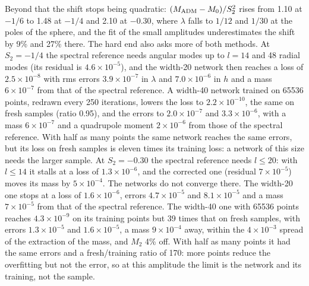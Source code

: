 \documentclass[aps,prd,twocolumn,superscriptaddress, nofootinbib,floatfix]{revtex4-2}
\begin{document}
Beyond that the shift stops being quadratic: $(M_{\rm ADM}-M_0)/S_2^2$ rises from 1.10 at $-1/6$ to 1.48 at $-1/4$ and 2.10 at $-0.30$, where $\lambda$ falls to $1/12$ and $1/30$ at the poles of the sphere, and the fit of the small amplitudes underestimates the shift by 9\% and 27\% there.
The hard end also asks more of both methods.
At $S_2=-1/4$ the spectral reference needs angular modes up to $l=14$ and 48 radial modes (its residual is $4.6\times10^{-5}$), and the width-20 network then reaches a loss of $2.5\times10^{-8}$ with rms errors $3.9\times10^{-7}$ in $\lambda$ and $7.0\times10^{-6}$ in $h$ and a mass $6\times10^{-7}$ from that of the spectral reference.
A width-40 network trained on 65536 points, redrawn every 250 iterations, lowers the loss to $2.2\times10^{-10}$, the same on fresh samples (ratio 0.95), and the errors to $2.0\times10^{-7}$ and $3.3\times10^{-6}$, with a mass $6\times10^{-7}$ and a quadrupole moment $2\times10^{-6}$ from those of the spectral reference.
With half as many points the same network reaches the same errors, but its loss on fresh samples is eleven times its training loss: a network of this size needs the larger sample.
At $S_2=-0.30$ the spectral reference needs $l\leq20$: with $l\leq14$ it stalls at a loss of $1.3\times10^{-6}$, and the corrected one (residual $7\times10^{-5}$) moves its mass by $5\times10^{-4}$.
The networks do not converge there.
The width-20 one stops at a loss of $1.6\times10^{-6}$, errors $4.7\times10^{-5}$ and $8.1\times10^{-5}$ and a mass $7\times10^{-5}$ from that of the spectral reference.
The width-40 one with 65536 points reaches $4.3\times10^{-9}$ on its training points but 39 times that on fresh samples, with errors $1.3\times10^{-5}$ and $1.6\times10^{-5}$, a mass $9\times10^{-4}$ away, within the $4\times10^{-3}$ spread of the extraction of the mass, and $M_2$ 4\% off.
With half as many points it had the same errors and a fresh/training ratio of 170: more points reduce the overfitting but not the error, so at this amplitude the limit is the network and its training, not the sample.
\end{document}
